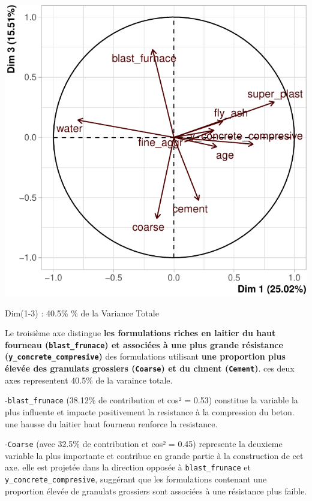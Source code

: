 \documentclass[
  12pt,
]{article}
\begin{document}
\begin{center}\includegraphics{rmd_final_files/figure-latex/unnamed-chunk-34-1} \end{center}

Dim(1-3) : 40.5\% \% de la Variance Totale

Le troisième axe distingue \textbf{les formulations riches en laitier du
haut fourneau (\texttt{blast\_frunace}) et associées à une plus grande
résistance (\texttt{y\_concrete\_compresive})} des formulations
utilisant \textbf{une proportion plus élevée des granulats grossiers
(\texttt{Coarse}) et du ciment (\texttt{Cement})}. ces deux axes
representent 40.5\% de la varaince totale.

-\texttt{blast\_frunace} (38.12\% de contribution et cos² = 0.53)
constitue la variable la plus influente et impacte positivement la
resistance à la compression du beton. une hausse du laitier haut
fourneau renforce la resistance.

-\texttt{Coarse} (avec 32.5\% de contribution et cos² = 0.45) represente
la deuxieme variable la plus importante et contribue en grande partie à
la construction de cet axe. elle est projetée dans la direction opposée
à \texttt{blast\_frunace} et \texttt{y\_concrete\_compresive}, suggérant
que les formulations contenant une proportion élevée de granulats
grossiers sont associées à une résistance plus faible.
\end{document}
